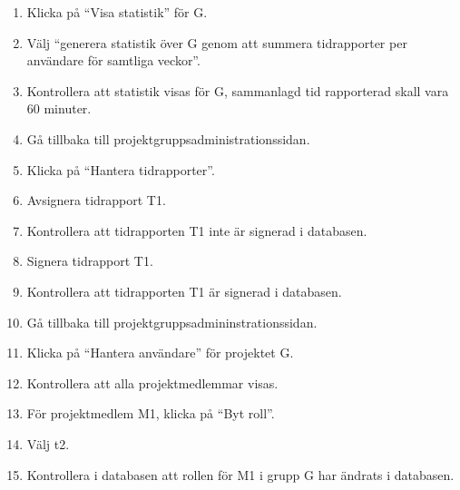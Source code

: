 \documentclass[a4paper]{article}
\begin{document}
\begin{FT}
\begin{enumerate}
\item Klicka på ``Visa statistik'' för G.
\item Välj ``generera statistik över G genom att summera tidrapporter per användare för samtliga veckor''.
\item Kontrollera att statistik visas för G, sammanlagd tid rapporterad skall vara 60 minuter.
\item Gå tillbaka till projektgruppsadministrationssidan.
\item Klicka på ``Hantera tidrapporter''.
\item Avsignera tidrapport T1.
\item Kontrollera att tidrapporten T1 inte är signerad i databasen.
\item Signera tidrapport T1.
\item Kontrollera att tidrapporten T1 är signerad i databasen.
\item Gå tillbaka till projektgruppsadmininstrationssidan.
\item Klicka på ``Hantera användare'' för projektet G.
\item Kontrollera att alla projektmedlemmar visas.
\item För projektmedlem M1, klicka på ``Byt roll''.
\item Välj t2.
\item Kontrollera i databasen att rollen för M1 i grupp G har ändrats i databasen.
\end{enumerate}
\end{FT}
\end{document}
